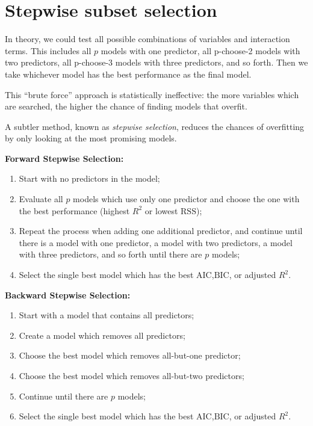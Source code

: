 \documentclass[openany]{book}
\providecommand{\tightlist}{%
  \setlength{\itemsep}{0pt}\setlength{\parskip}{0pt}}
\begin{document}
\hypertarget{stepwise-subset-selection}{%
\section{Stepwise subset selection}\label{stepwise-subset-selection}}

In theory, we could test all possible combinations of variables and interaction terms. This includes all \(p\) models with one predictor, all p-choose-2 models with two predictors, all p-choose-3 models with three predictors, and so forth. Then we take whichever model has the best performance as the final model.

This ``brute force'' approach is statistically ineffective: the more variables which are searched, the higher the chance of finding models that overfit.

A subtler method, known as \emph{stepwise selection}, reduces the chances of overfitting by only looking at the most promising models.

\textbf{Forward Stepwise Selection:}

\begin{enumerate}
\def\labelenumi{\arabic{enumi}.}
\tightlist
\item
  Start with no predictors in the model;
\item
  Evaluate all \(p\) models which use only one predictor and choose the one with the best performance (highest \(R^2\) or lowest \(\text{RSS}\));
\item
  Repeat the process when adding one additional predictor, and continue until there is a model with one predictor, a model with two predictors, a model with three predictors, and so forth until there are \(p\) models;
\item
  Select the single best model which has the best \(\text{AIC}\),\(\text{BIC}\), or adjusted \(R^2\).
\end{enumerate}

\textbf{Backward Stepwise Selection:}

\begin{enumerate}
\def\labelenumi{\arabic{enumi}.}
\tightlist
\item
  Start with a model that contains all predictors;
\item
  Create a model which removes all predictors;
\item
  Choose the best model which removes all-but-one predictor;
\item
  Choose the best model which removes all-but-two predictors;
\item
  Continue until there are \(p\) models;
\item
  Select the single best model which has the best \(\text{AIC}\),\(\text{BIC}\), or adjusted \(R^2\).
\end{enumerate}
\end{document}
